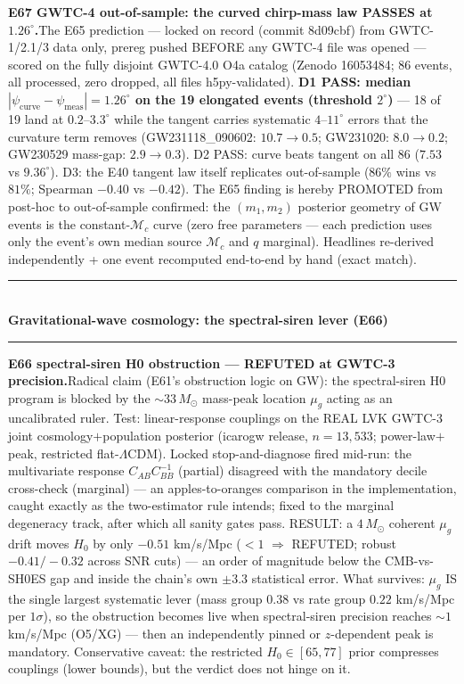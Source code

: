\documentclass[10pt]{article}
\newcommand{\entry}[2]{\vspace{5pt}\noindent\textbf{#1}\quad #2\par}
\newcommand{\grouphead}[1]{\vspace{9pt}\noindent\rule{\linewidth}{0.4pt}\\[-2pt]{\small\textbf{#1}}\\[-4pt]\rule{\linewidth}{0.4pt}\par\vspace{2pt}}
\begin{document}
\entry{E67 GWTC-4 out-of-sample: the curved chirp-mass law PASSES at $1.26^\circ$.}{The E65
prediction --- locked on record (commit 8d09cbf) from GWTC-1/2.1/3 data only, prereg pushed BEFORE
any GWTC-4 file was opened --- scored on the fully disjoint GWTC-4.0 O4a catalog (Zenodo 16053484;
86 events, all processed, zero dropped, all files h5py-validated). \textbf{D1 PASS: median
$|\psi_\mathrm{curve}-\psi_\mathrm{meas}| = 1.26^\circ$ on the 19 elongated events (threshold
$2^\circ$)} --- 18 of 19 land at $0.2$--$3.3^\circ$ while the tangent carries systematic
$4$--$11^\circ$ errors that the curvature term removes (GW231118\_090602: $10.7\to0.5$;
GW231020: $8.0\to0.2$; GW230529 mass-gap: $2.9\to0.3$). D2 PASS: curve beats tangent on all 86
($7.53$ vs $9.36^\circ$). D3: the E40 tangent law itself replicates out-of-sample ($86\%$ wins vs
$81\%$; Spearman $-0.40$ vs $-0.42$). The E65 finding is hereby PROMOTED from post-hoc to
out-of-sample confirmed: the $(m_1,m_2)$ posterior geometry of GW events is the
constant-$\mathcal{M}_c$ curve (zero free parameters --- each prediction uses only the event's own
median source $\mathcal{M}_c$ and $q$ marginal). Headlines re-derived independently + one event
recomputed end-to-end by hand (exact match).}

\grouphead{Gravitational-wave cosmology: the spectral-siren lever (E66)}

\entry{E66 spectral-siren H0 obstruction --- REFUTED at GWTC-3 precision.}{Radical claim (E61's
obstruction logic on GW): the spectral-siren H0 program is blocked by the $\sim\!33\,M_\odot$
mass-peak location $\mu_g$ acting as an uncalibrated ruler. Test: linear-response couplings on the
REAL LVK GWTC-3 joint cosmology$+$population posterior (icarogw release, $n=13{,}533$; power-law$+$
peak, restricted flat-$\Lambda$CDM). Locked stop-and-diagnose fired mid-run: the multivariate
response $C_{AB}C_{BB}^{-1}$ (partial) disagreed with the mandatory decile cross-check (marginal)
--- an apples-to-oranges comparison in the implementation, caught exactly as the two-estimator rule
intends; fixed to the marginal degeneracy track, after which all sanity gates pass. RESULT: a
$4\,M_\odot$ coherent $\mu_g$ drift moves $H_0$ by only $-0.51$ km/s/Mpc ($<1$ $\Rightarrow$
REFUTED; robust $-0.41/-0.32$ across SNR cuts) --- an order of magnitude below the CMB-vs-SH0ES gap
and inside the chain's own $\pm3.3$ statistical error. What survives: $\mu_g$ IS the single largest
systematic lever (mass group $0.38$ vs rate group $0.22$ km/s/Mpc per $1\sigma$), so the obstruction
becomes live when spectral-siren precision reaches $\sim\!1$ km/s/Mpc (O5/XG) --- then an
independently pinned or $z$-dependent peak is mandatory. Conservative caveat: the restricted
$H_0\in[65,77]$ prior compresses couplings (lower bounds), but the verdict does not hinge on it.}
\end{document}
